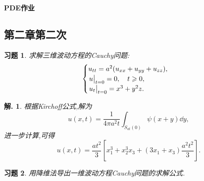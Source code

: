 \documentclass[a4paper,oneside,12pt]{ctexart}
\theoremstyle{plain}
\newtheorem{exercise}{习题}
\theoremstyle{nonumberplain}
\newtheorem{solution}{解.}
\theoremstyle{nonumberplain}
\begin{document}
    \begin{center}
        \LARGE\bfseries
        PDE作业
    \end{center}

    \subsection*{第二章第二次}

    \begin{exercise}
        \label{ex:19}
        求解三维波动方程的Cauchy问题:
        \begin{equation*}
            \begin{cases}
                u_{tt}=a^2(u_{xx}+u_{yy}+u_{zz}),\\
                \eval{u}_{t=0}=0,\quad t\geqslant 0,\\
                \eval{u_t}_{t=0}=x^3+y^2z.
            \end{cases}
        \end{equation*}
    \end{exercise}
    
    \begin{solution}
        根据Kirchoff公式,解为 
        \begin{equation*}
            u(x,t)=\frac{1}{4\pi a^2t}\int_{S_{at}(0)}\psi(x+y)\dd y,
        \end{equation*}
        进一步计算,可得 
        \begin{equation*}
            u(x,t)=\frac{at^2}{3}\left[x_1^3+x_2^3x_3+(3x_1+x_3)\frac{a^2t^2}{3}\right].
        \end{equation*}
    \end{solution}
    
    \begin{exercise}
        \label{ex:20}
        用降维法导出一维波动方程Cauchy问题的求解公式.
    \end{exercise}
    
\end{document}
